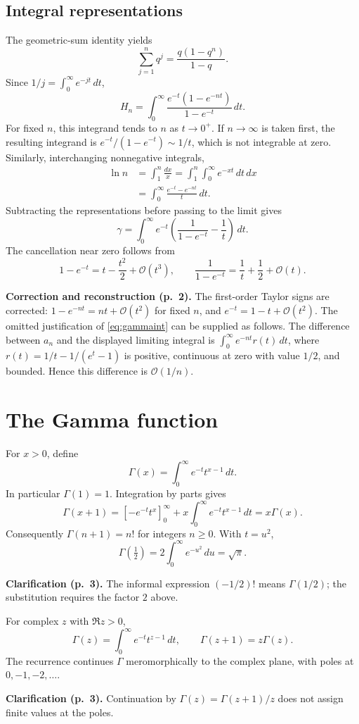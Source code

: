 \documentclass[11pt,a4paper]{article}
\newcommand{\OO}{\mathcal O}
\newcommand{\src}[1]{\par\smallskip{\small\color{gray}Source PDF: page(s) #1.}\par}
\newcommand{\edit}[2]{\par\begingroup\small\color{blue!55!black}\textbf{#1.} #2\par\endgroup}
\numberwithin{equation}{section}
\begin{document}
\subsection{Integral representations}
The geometric-sum identity yields
\[
 \sum_{j=1}^n q^j=\frac{q(1-q^n)}{1-q}.
\]
Since $1/j=\int_0^\infty e^{-jt}\,dt$,
\begin{equation}
 H_n=\int_0^\infty
 \frac{e^{-t}(1-e^{-nt})}{1-e^{-t}}\,dt.
\end{equation}
For fixed $n$, this integrand tends to $n$ as $t\to0^+$.
If $n\to\infty$ is taken first, the resulting integrand is
$e^{-t}/(1-e^{-t})\sim1/t$, which is not integrable at zero.
Similarly, interchanging nonnegative integrals,
\begin{align}
 \ln n&=\int_1^n\frac{dx}{x}
 =\int_1^n\int_0^\infty e^{-xt}\,dt\,dx\\
 &=\int_0^\infty\frac{e^{-t}-e^{-nt}}t\,dt.
\end{align}
Subtracting the representations before passing to the limit gives
\begin{equation}\label{eq:gammaint}
 \gamma=\int_0^\infty e^{-t}
 \left(\frac1{1-e^{-t}}-\frac1t\right)\,dt.
\end{equation}
The cancellation near zero follows from
\[
 1-e^{-t}=t-\frac{t^2}2+\OO(t^3),\qquad
 \frac1{1-e^{-t}}=\frac1t+\frac12+\OO(t).
\]
\edit{Correction and reconstruction (p.~2)}{The first-order Taylor signs
are corrected: $1-e^{-nt}=nt+\OO(t^2)$ for fixed $n$, and
$e^{-t}=1-t+\OO(t^2)$. The omitted justification of
\eqref{eq:gammaint} can be supplied as follows. The difference between
$a_n$ and the displayed limiting integral is
$\int_0^\infty e^{-nt}r(t)\,dt$, where
$r(t)=1/t-1/(e^t-1)$ is positive, continuous at zero with value $1/2$,
and bounded. Hence this difference is $\OO(1/n)$.}

\section{The Gamma function}
\src{2--4}
For $x>0$, define
\begin{equation}
 \Gamma(x)=\int_0^\infty e^{-t}t^{x-1}\,dt.
\end{equation}
In particular $\Gamma(1)=1$. Integration by parts gives
\[
 \Gamma(x+1)=[-e^{-t}t^x]_0^\infty
 +x\int_0^\infty e^{-t}t^{x-1}\,dt=x\Gamma(x).
\]
Consequently $\Gamma(n+1)=n!$ for integers $n\ge0$.
With $t=u^2$,
\[
 \Gamma\left(\tfrac12\right)
 =2\int_0^\infty e^{-u^2}\,du=\sqrt\pi.
\]
\edit{Clarification (p.~3)}{The informal expression $(-1/2)!$ means
$\Gamma(1/2)$; the substitution requires the factor $2$ above.}
For complex $z$ with $\Re z>0$,
\[
 \Gamma(z)=\int_0^\infty e^{-t}t^{z-1}\,dt,\qquad
 \Gamma(z+1)=z\Gamma(z).
\]
The recurrence continues $\Gamma$ meromorphically to the complex plane,
with poles at $0,-1,-2,\ldots$.
\edit{Clarification (p.~3)}{Continuation by $\Gamma(z)=\Gamma(z+1)/z$
does not assign finite values at the poles.}
\end{document}
